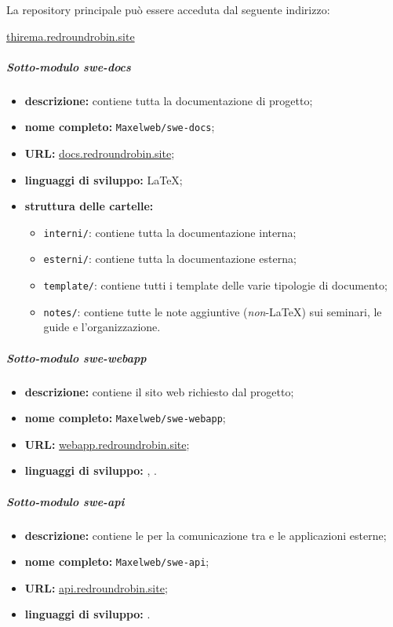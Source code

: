 		La repository principale può essere acceduta dal seguente indirizzo:

		\href{https://github.com/Maxelweb/swe-thirema}{thirema.redroundrobin.site}

		\subparagraph{Sotto-modulo swe-docs}

		\begin{itemize}
		 	\item \textbf{descrizione:} contiene tutta la documentazione di progetto;
		 	\item \textbf{nome completo:} \verb!Maxelweb/swe-docs!;
		 	\item \textbf{URL:} \href{https://github.com/Maxelweb/swe-docs}{docs.redroundrobin.site};
		 	\item \textbf{linguaggi di sviluppo:} \LaTeX{};
		 	\item \textbf{struttura delle cartelle:}
			\begin{itemize}
				\item \verb!interni/!: contiene tutta la documentazione interna;
				\item \verb!esterni/!: contiene tutta la documentazione esterna;
				\item \verb!template/!: contiene tutti i template delle varie tipologie di documento;
				\item \verb!notes/!: contiene tutte le note aggiuntive (\textit{non}-\LaTeX{}) sui seminari, le guide e l'organizzazione.
			\end{itemize}
		 \end{itemize}

		\subparagraph{Sotto-modulo swe-webapp}

		\begin{itemize}
		 	\item \textbf{descrizione:} contiene il sito web richiesto dal progetto;
		 	\item \textbf{nome completo:} \verb!Maxelweb/swe-webapp!;
		 	\item \textbf{URL:} \href{https://github.com/Maxelweb/swe-webapp}{webapp.redroundrobin.site};
		 	\item \textbf{linguaggi di sviluppo:} , .
		 \end{itemize}

		\subparagraph{Sotto-modulo swe-api}

		\begin{itemize}
		 	\item \textbf{descrizione:} contiene le  per la comunicazione tra  e le applicazioni esterne;
		 	\item \textbf{nome completo:} \verb!Maxelweb/swe-api!;
		 	\item \textbf{URL:} \href{https://github.com/Maxelweb/swe-api}{api.redroundrobin.site};
		 	\item \textbf{linguaggi di sviluppo:} .
		 \end{itemize}

